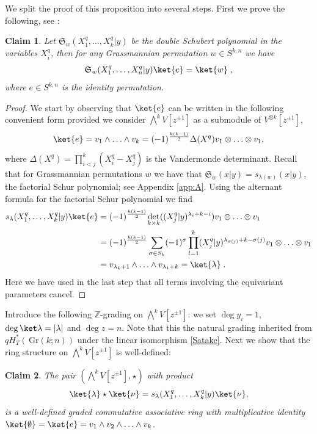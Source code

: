 \documentclass[12pt]{amsart}
\newcommand{\Z}{\mathbb{Z}}
\newcommand{\Gr}{\,\mathrm{Gr}}
\newcommand{\fS}{\mathfrak{S}}
\newtheorem{claim}{Claim}[section]
\numberwithin{equation}{section}
\numberwithin{figure}{section}
\begin{document}
We split the proof of this proposition into several steps. First we prove the following, see \cite[Thrm 1.2]{Laksov09}:
\begin{claim}
    Let $\fS_{w}(X^q_1, \ldots, X^q_k|y)$ be the double Schubert polynomial in the variables $X^q_i$, then for any Grassmannian permutation $w\in S^{k,n}$ we have
    \begin{equation}\label{action}
        \fS_{w}(X^q_1, \dots, X^q_n | y) \ket{e} = \ket{w}\;,
    \end{equation}
    where $e\in S^{k,n}$ is the identity permutation.
\end{claim}

\begin{proof}
We start by observing that $\ket{e}$ can be written in the following convenient form provided we consider $\bigwedge^kV[z^{\pm 1}]$ as a submodule of $V^{\otimes k}[z^{\pm1}]$,
\[
\ket{e} = v_1 \wedge \ldots\wedge v_k = (-1)^{\frac{k (k - 1)}{2}}\Delta(X^q) v_1 \otimes \ldots \otimes v_1,
\]
where $\Delta(X^q) = \prod\limits_{i<j}^k(X^q_i - X^q_j)$ is the Vandermonde determinant. Recall that for Grassmannian permutations $w$ we have that $\fS_w(x|y)=s_{\lambda(w)}(x|y)$, the factorial Schur polynomial; see Appendix \ref{app:A}. Using the alternant formula for the factorial Schur polynomial we find
\begin{align*}
s_{\lambda}(X^q_1, \ldots , X^q_k |y)\ket{e} =\;& (-1)^{\frac{k(k-1)}{2}}\underset{k \times k}{\det}((X^q_j |y)^{\lambda_i + k -i})v_1 \otimes \ldots\otimes v_1 \\
=\;& (-1)^{\frac{k(k-1)}{2}} \sum\limits_{\sigma \in S_k}(-1)^{\sigma} \prod\limits_{l = 1}^k (X^q_j|y)^{\lambda_{\sigma(j)} + k - \sigma(j)} v_1\otimes \ldots\otimes v_1\\ 
=\;& v_{\lambda_k + 1} \wedge \ldots\wedge v_{\lambda_1 + k} = \ket{\lambda}\;.
\end{align*}
Here we have used in the last step that all terms involving the equivariant parameters cancel.
\end{proof}
Introduce the following $\Z$-grading on $\bigwedge^kV[z^{\pm1}]$: we set $\deg y_i=1$, $\deg\ket\lambda=|\lambda|$ and $\deg z=n$. Note that this the natural grading inherited from $qH^*_T(\Gr(k;n))$ under the linear isomorphism \eqref{Satake}. %
Next we show that the ring structure on $\bigwedge^kV[z^{\pm1}]$ is well-defined:
\begin{claim}
    The pair $(\bigwedge^kV[z^{\pm1}],\star)$ with product
    \begin{equation}\label{star_product}
    \ket{\lambda}\star \ket{\nu}=s_{\lambda}(X^q_1, \ldots, X^q_k|y)\ket{\nu},  
    \end{equation}
    is a well-defined graded commutative associative ring with multiplicative identity $\ket{\emptyset}=\ket{e}=v_1\wedge v_2\wedge\ldots\wedge v_k$.
\end{claim}
\end{document}
